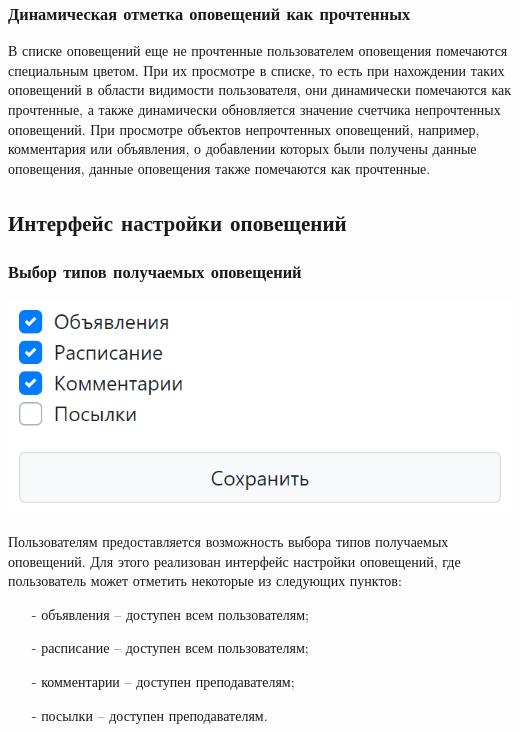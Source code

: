 \documentclass[12pt, a4paper, oneside]{article}
\begin{document}
\subsubsection{Динамическая отметка оповещений как прочтенных}
В списке оповещений еще не прочтенные пользователем оповещения помечаются специальным цветом. При их просмотре в списке, то есть при нахождении таких оповещений в области видимости пользователя, они динамически помечаются как прочтенные, а также динамически обновляется значение счетчика непрочтенных оповещений. При просмотре объектов непрочтенных оповещений, например, комментария или объявления, о добавлении которых были получены данные оповещения, данные оповещения также помечаются как прочтенные.
\subsection{Интерфейс настройки оповещений}
\subsubsection{Выбор типов получаемых оповещений}
\begin{center}
    \includegraphics[scale=0.45]{activity-settings}
\end{center}

Пользователям предоставляется возможность выбора типов получаемых оповещений. Для этого реализован интерфейс настройки оповещений, где пользователь может отметить некоторые из следующих пунктов:
\begin{itemize}
    \item [-] объявления – доступен всем пользователям;
    \item [-] расписание – доступен всем пользователям;
    \item [-] комментарии – доступен преподавателям;
    \item [-] посылки – доступен преподавателям.
\end{itemize}
\end{document}
